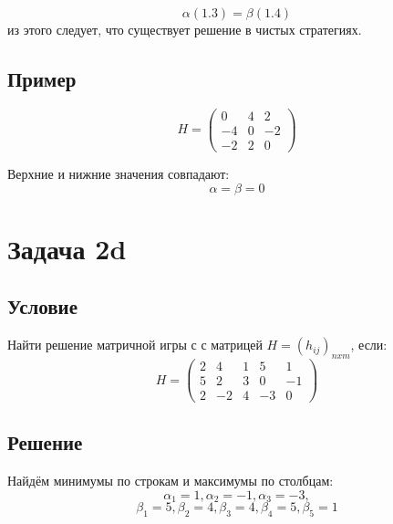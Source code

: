 \documentclass[a4paper,14pt]{extreport}
\begin{document}
\begin{equation}
    \alpha (1.3) = \beta (1.4)
\end{equation}
из этого следует, что существует решение в чистых стратегиях.

\subsection{Пример}
\begin{equation*}
    H = \begin{pmatrix} 
            0 & 4 & 2 \\
            -4 & 0 & -2 \\
            -2 & 2 & 0
        \end{pmatrix}
\end{equation*}

Верхние и нижние значения совпадают:
\begin{equation}
    \alpha = \beta = 0
\end{equation}

\section{Задача 2d}
\subsection{Условие}

Найти решение матричной игры с с матрицей $H=(h_{ij})_{nxm}$, если: 
\begin{equation*}
    H = \begin{pmatrix} 
            2 & 4 & 1 & 5 & 1 \\ 
            5 & 2 & 3 & 0 & -1 \\
            2 & -2 & 4 & -3 & 0
        \end{pmatrix}
\end{equation*}

\subsection{Решение}
Найдём минимумы по строкам и максимумы по столбцам:
\begin{equation}
    \alpha_1 = 1, 
    \alpha_2 = -1,
    \alpha_3 = -3, 
\end{equation}
\begin{equation}
    \beta_1 = 5,
    \beta_2 = 4,
    \beta_3 = 4,
    \beta_4 = 5,
    \beta_5 = 1
\end{equation}
\end{document}
